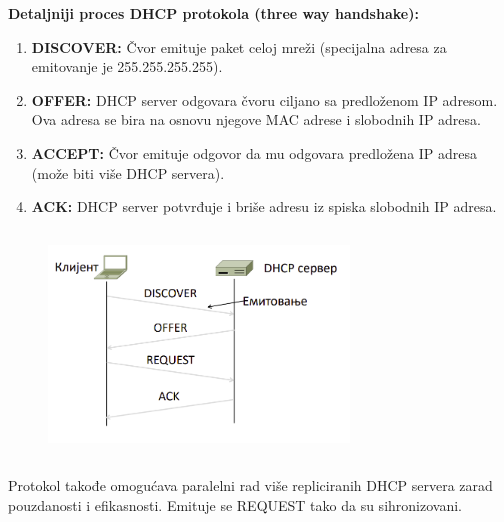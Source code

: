 \documentclass[a4paper]{article}
\begin{document}
        \noindent \textbf{Detaljniji proces DHCP protokola (three way handshake):}
        \begin{enumerate}
            \item \textbf{DISCOVER:} Čvor emituje paket celoj mreži (specijalna adresa za emitovanje je 255.255.255.255).
            \item \textbf{OFFER:} DHCP server odgovara čvoru ciljano sa predloženom IP adresom. Ova adresa se bira
                  na osnovu njegove MAC adrese i slobodnih IP adresa.
            \item \textbf{ACCEPT:} Čvor emituje odgovor da mu odgovara predložena IP adresa (može biti više
                  DHCP servera).
            \item \textbf{ACK:} DHCP server potvrđuje i briše adresu iz spiska slobodnih IP adresa.
        \end{enumerate}
        \begin{figure}[H]
            \begin{center}
                \includegraphics[width=80mm,height=60mm]{Slike/dhcp.png}
            \end{center}
        \end{figure}
        Protokol takođe omogućava paralelni rad više repliciranih DHCP servera zarad pouzdanosti
        i efikasnosti. Emituje se REQUEST tako da su sihronizovani.
    
\end{document}
